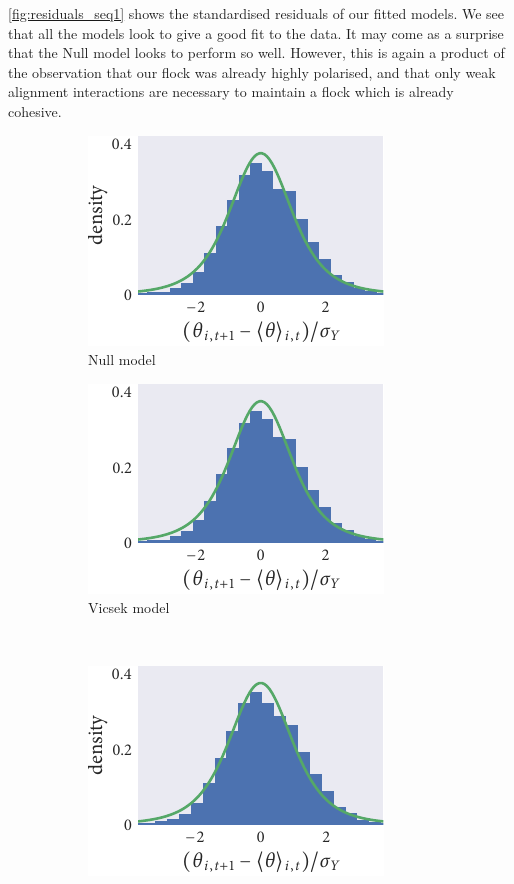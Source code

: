 \cref{fig:residuals_seq1} shows the standardised residuals of our fitted
models. We see that all the models look to give a good fit to the data. It may
come as a surprise that the Null model looks to perform so well. However, this
is again a product of the observation that our flock was already highly
polarised, and that only weak alignment interactions are necessary to maintain
a flock which is already cohesive.

\begin{figure}[tbb]
  \begin{subfigure}[t]{0.33333\textwidth}
    \caption{Null model}
    \includegraphics{seq1/null_residuals.pdf}
  \end{subfigure}\hspace{2pt}
  \begin{subfigure}[t]{0.33333\textwidth}
    \caption{Vicsek model}
    \includegraphics{seq1/r_residuals.pdf}
  \end{subfigure}\vspace{1em}\\
  \begin{subfigure}[t]{0.33333\textwidth}
    \includegraphics{seq1/power_residuals.pdf}

\end{subfigure}
\end{figure}
